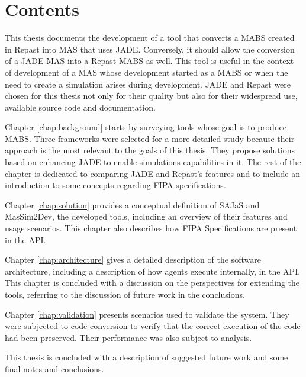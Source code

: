 \section{Contents}

This thesis documents the development of a tool that converts a MABS created in Repast into MAS that uses JADE. Conversely, it should allow the conversion of a JADE MAS into a Repast MABS as well. This tool is useful in the context of development of a MAS whose development started as a MABS or when the need to create a simulation arises during development. JADE and Repast were chosen for this thesis not only for their quality but also for their widespread use, available source code and documentation.

Chapter \ref{chap:background} starts by surveying tools whose goal is to produce MABS. Three frameworks were selected for a more detailed study because their approach is the most relevant to the goals of this thesis. They propose solutions based on enhancing JADE to enable simulations capabilities in it. The rest of the chapter is dedicated to comparing JADE and Repast's features and to include an introduction to some concepts regarding FIPA specifications.

Chapter \ref{chap:solution} provides a conceptual definition of SAJaS and MasSim2Dev, the developed tools, including an overview of their features and usage scenarios. This chapter also describes how FIPA Specifications are present in the API.

Chapter \ref{chap:architecture} gives a detailed description of the software architecture, including a description of how agents execute internally, in the API. This chapter is concluded with a discussion on the perspectives for extending the tools, referring to the discussion of future work in the conclusions.

Chapter \ref{chap:validation} presents scenarios used to validate the system. They were subjected to code conversion to verify that the correct execution of the code had been preserved. Their performance was also subject to analysis.

This thesis is concluded with a description of suggested future work and some final notes and conclusions.